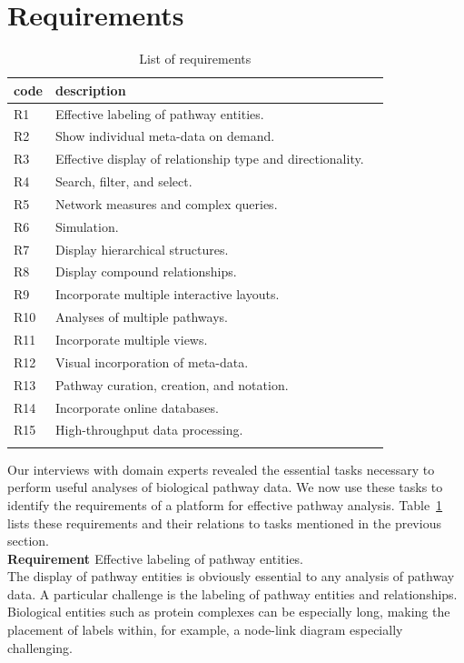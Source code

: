 \documentclass[review,journal]{vgtc}         %
\newcounter{task}
\newcounter{requirement}
\newcommand*{\reqlabel}[1]{\refstepcounter{requirement}\therequirement\label{#1}}
\begin{document}
\section{Requirements}
\label{sec:requirements}

\begin{table}[h]

\caption{List of requirements}

\begin{tabular}{p{0.5cm}p{6cm}p{1.2cm}}
\hline
code & description \\
\hline
R1 & Effective labeling of pathway entities. \\
R2 & Show individual meta-data on demand.\\
R3 & Effective display of relationship type and directionality.\\
R4 & Search, filter, and select.\\
R5 & Network measures and complex queries.\\
R6 & Simulation.\\
R7 & Display hierarchical structures. \\
R8 & Display compound relationships.\\
R9 & Incorporate multiple interactive layouts.\\
R10 & Analyses of multiple pathways.\\
R11 & Incorporate multiple views.\\
R12 & Visual incorporation of meta-data. \\
R13 & Pathway curation, creation, and notation. \\
R14 & Incorporate online databases. \\
R15 & High-throughput data processing. \\
\hline
\label{table:requirements}
\end{tabular}
\end{table}

Our interviews with domain experts revealed the essential tasks necessary to perform useful analyses of biological pathway data. We now use these tasks to identify the requirements of a platform for effective pathway analysis. Table~\ref{table:requirements} lists these requirements and their relations to tasks mentioned in the previous section.
\ \\

\textbf{Requirement \reqlabel{req:labeling}} Effective labeling of pathway entities.
\ \\

The display of pathway entities is obviously essential to any analysis of pathway data. A particular challenge is the labeling of pathway entities and relationships. Biological entities such as protein complexes can be especially long, making the placement of labels within, for example, a node-link diagram especially challenging.
\ \\
\end{document}
